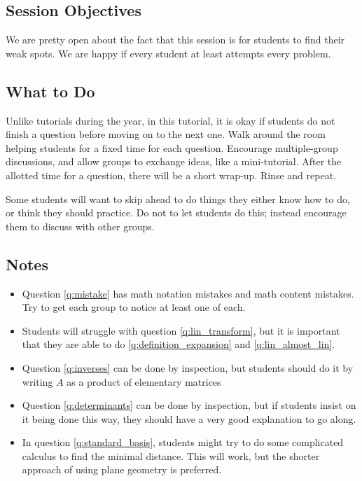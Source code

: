 \documentclass[red]{tutorial}
\theoremstyle{definition}
\theoremstyle{theorem}
\begin{document}
\begin{instructions}
  \subsection*{Session Objectives}
  We are pretty open about the fact that this session is for students to find
  their weak spots. We are happy if every student at least attempts every
  problem.

  \subsection*{What to Do}
  Unlike tutorials during the year, in this tutorial, it is okay if students do
  not finish a question before moving on to the next one. Walk around the room
  helping students for a fixed time for each question. Encourage multiple-group
  discussions, and allow groups to exchange ideas, like a mini-tutorial. After
  the allotted time for a question, there will be a short wrap-up. Rinse and
  repeat.

  Some students will want to skip ahead to do things they either know how to
  do, or think they should practice. Do not to let students do this; instead
  encourage them to discuss with other groups.
  \subsection*{Notes}
  \begin{itemize}
    \item
      Question \ref{q:mistake} has math notation mistakes and math content
      mistakes. Try to get each group to notice at least one of each.
    \item
      Students will struggle with question \ref{q:lin_transform}, but it is
      important that they are able to do \ref{q:definition_expansion} and
      \ref{q:lin_almost_lin}.
    \item
      Question \ref{q:inverses} can be done by inspection, but students should
      do it by writing $A$ as a product of elementary matrices
    \item
      Question \ref{q:determinants} can be done by inspection, but if students
      insist on it being done this way, they should have a very good
      explanation to go along.
    \item
      In question \ref{q:standard_basis}, students might try to do some
      complicated calculus to find the minimal distance. This will work, but
      the shorter approach of using plane geometry is preferred.
  \end{itemize}
\end{instructions}
\end{document}
